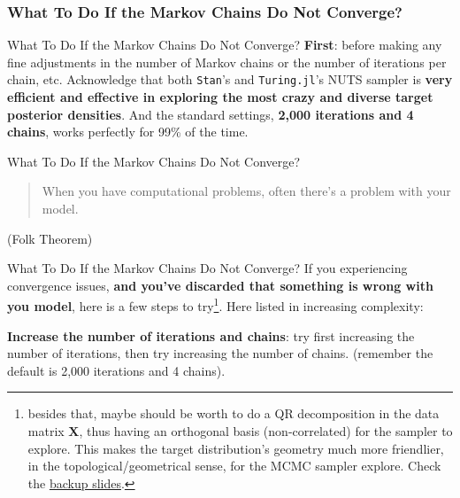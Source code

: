 \subsubsection{What To Do If the Markov Chains Do Not Converge?}
\begin{frame}{What To Do If the Markov Chains Do Not Converge?}
	\textbf{First}: before making any fine adjustments in the number of Markov chains
	or the number of iterations per chain, etc.
	Acknowledge that both \texttt{Stan}'s and \texttt{Turing.jl}'s NUTS sampler is
	\textbf{very efficient and effective in exploring the
		most crazy and diverse target posterior densities}.
	\vfill
	And the standard settings, \textbf{2,000 iterations and 4 chains},
	works perfectly for 99\% of the time.
\end{frame}

\begin{frame}{What To Do If the Markov Chains Do Not Converge?}
	\vfill
	\begin{quotation}
		When you have computational problems,
		often there’s a problem with your model.
	\end{quotation}
	\vfill \vfill
	\textcite{gelmanFolkTheoremStatistical2008} (Folk Theorem)
\end{frame}

\begin{frame}{What To Do If the Markov Chains Do Not Converge?}
	If you experiencing convergence issues,
	\textbf{and you've discarded that something is wrong with you model},
	here is a few steps to try\footnote{
		besides that,
		maybe should be worth to do a QR decomposition in the data matrix $\mathbf{X}$,
		thus having an orthogonal basis (non-correlated) for the sampler to explore.
		This makes the target distribution's geometry much more friendlier,
		in the topological/geometrical sense,
		for the MCMC sampler explore.
		Check the \hyperlink{appendixqr}{backup slides}.}.
	Here listed in increasing complexity:
	\begin{vfilleditems}
		\item[1.] \textbf{Increase the number of iterations and chains}:
		try first increasing the number of iterations,
		then try increasing the number of chains.
		(remember the default is 2,000 iterations and 4 chains).
	\end{vfilleditems}
\end{frame}

